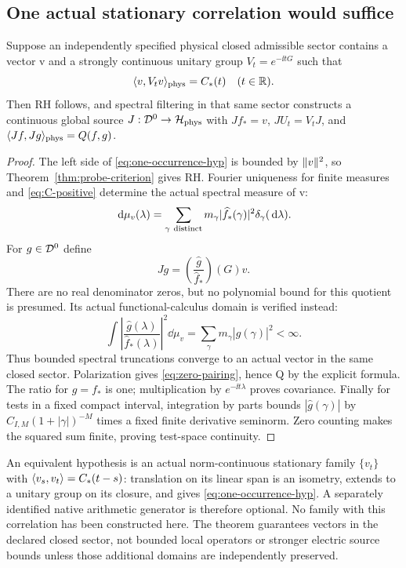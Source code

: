 \subsection{One actual stationary correlation would suffice}
\begin{theorem}\label{thm:one-occurrence}
Suppose an independently specified physical closed
admissible sector contains a vector v and a strongly
continuous unitary group $V_t=e^{-\ii tG}$ such that
\begin{equation}\label{eq:one-occurrence-hyp}
\langle v,V_tv\rangle_{\rm phys}=C_*(t)\quad(t\in\mathbb R).
\end{equation}
Then RH follows, and spectral filtering in that same
sector constructs a continuous global source
$J:\mathcal D^0\to\mathcal H_{\rm phys}$ with
$Jf_*=v$, $JU_t=V_tJ$, and
$\langle Jf,Jg\rangle_{\rm phys}=Q(f,g)$.
\end{theorem}
\begin{proof}
The left side of \eqref{eq:one-occurrence-hyp} is bounded
by $\lVert v\rVert^2$, so Theorem~\ref{thm:probe-criterion} gives
RH. Fourier uniqueness for finite measures and
\eqref{eq:C-positive} determine the actual spectral
measure of v:
\begin{equation}
\,\mathrm d\mu_v(\lambda)=
\sum_{\gamma\ {\rm distinct}}
m_\gamma|\widehat f_*(\gamma)|^2\delta_\gamma(\,\mathrm d\lambda).
\end{equation}
For $g\in\mathcal D^0$ define
\begin{equation}\label{eq:filter-source}
Jg=\left(\frac{\widehat g}{\widehat f_*}\right)(G)v .
\end{equation}
There are no real denominator zeros, but no polynomial
bound for this quotient is presumed. Its actual
functional-calculus domain is verified instead:
\[
\int\left|\frac{\widehat g(\lambda)}
                    {\widehat f_*(\lambda)}\right|^2\dd\mu_v
=\sum_\gamma m_\gamma|\widehat g(\gamma)|^2<\infty.
\]
Thus bounded spectral truncations converge to an actual
vector in the same closed sector. Polarization gives
\eqref{eq:zero-pairing}, hence Q by the explicit formula.
The ratio for $g=f_*$ is one; multiplication by
$e^{-\ii t\lambda}$ proves covariance. Finally for tests
in a fixed compact interval, integration by parts bounds
$|\widehat g(\gamma)|$ by
$C_{I,M}(1+|\gamma|)^{-M}$ times a fixed finite derivative
seminorm. Zero counting makes the squared sum finite,
proving test-space continuity.
\end{proof}
An equivalent hypothesis is an actual norm-continuous
stationary family $\{v_t\}$ with
$\langle v_s,v_t\rangle=C_*(t-s)$: translation on its linear
span is an isometry, extends to a unitary group on its
closure, and gives \eqref{eq:one-occurrence-hyp}.
A separately identified native arithmetic generator is
therefore optional. No family with this correlation has
been constructed here. The theorem guarantees vectors
in the declared closed sector, not bounded local
operators or stronger electric source bounds unless
those additional domains are independently preserved.
